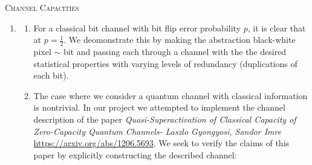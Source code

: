 \documentclass[11pt]{extarticle}	 %
\begin{document}
\setlength{\belowdisplayskip}{2pt} \setlength{\belowdisplayshortskip}{2pt}
\setlength{\abovedisplayskip}{2pt} \setlength{\abovedisplayshortskip}{2pt}
\begin{flushright}
\textsc{Channel Capacities\newline}				%
\end{flushright}
\vspace{-\baselineskip}\vspace{-\baselineskip}
\begin{flushleft}
\begin{enumerate}		%

\item

\begin{enumerate}[label=(\Alph*)]
\item
For a classical bit channel with bit flip error probability $p$, it is clear that at $p = \frac{1}{2}$. We deomonstrate this by making the abstraction black-white pixel $\sim$ bit and passing each through a channel with the the desired statistical properties with varying levels of redundancy (duplications of each bit).


\item

  The case where we consider a quantum channel with classical information is nontrivial. In our project we attempted to implement the channel description of the paper {\it Quasi-Superactivation of Classical Capacity of Zero-Capacity Quantum Channels- Laszlo Gyongyosi, Sandor Imre} \url{https://arxiv.org/abs/1206.5693}. We seek to verify the claims of this paper by explicitly constructing the described channel:


\end{enumerate}
\end{enumerate}
\end{flushleft}
\end{document}
